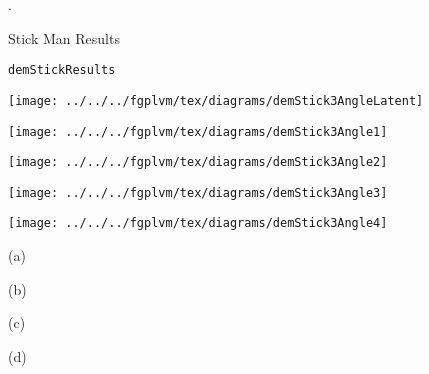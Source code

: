 .

Stick Man Results

\texttt{demStickResults}

\begin{center}
\texttt{[image: ../../../fgplvm/tex/diagrams/demStick3AngleLatent]}
\par\end{center}

%
\begin{minipage}[c][1\totalheight][t]{0.25\textwidth}%
\begin{center}
\texttt{[image: ../../../fgplvm/tex/diagrams/demStick3Angle1]}
\par\end{center}%
\end{minipage}%
\begin{minipage}[c][1\totalheight][t]{0.25\textwidth}%
\begin{center}
\texttt{[image: ../../../fgplvm/tex/diagrams/demStick3Angle2]}
\par\end{center}%
\end{minipage}%
\begin{minipage}[c][1\totalheight][t]{0.25\textwidth}%
\begin{center}
\texttt{[image: ../../../fgplvm/tex/diagrams/demStick3Angle3]}
\par\end{center}%
\end{minipage}%
\begin{minipage}[c][1\totalheight][t]{0.25\textwidth}%
\begin{center}
\texttt{[image: ../../../fgplvm/tex/diagrams/demStick3Angle4]}
\par\end{center}%
\end{minipage}

%
\begin{minipage}[c][1\totalheight][t]{0.25\textwidth}%
\begin{center}
(a)
\par\end{center}%
\end{minipage}%
\begin{minipage}[c][1\totalheight][t]{0.25\textwidth}%
\begin{center}
(b)
\par\end{center}%
\end{minipage}%
\begin{minipage}[c][1\totalheight][t]{0.25\textwidth}%
\begin{center}
(c)
\par\end{center}%
\end{minipage}%
\begin{minipage}[c][1\totalheight][t]{0.25\textwidth}%
\begin{center}
(d)
\par\end{center}%
\end{minipage}

